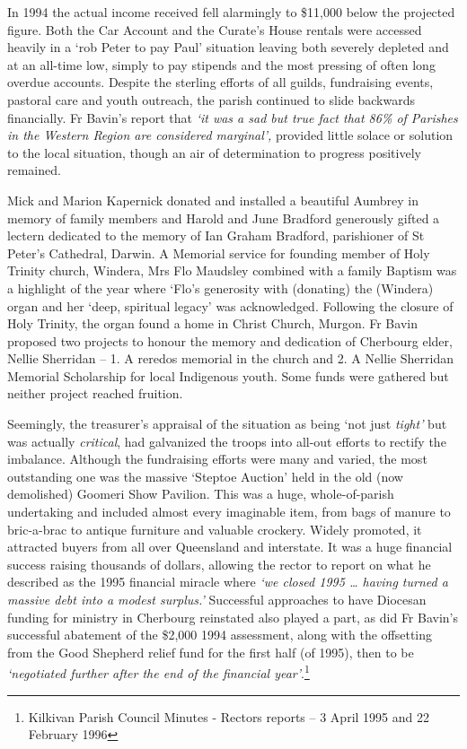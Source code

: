 In 1994 the actual income received fell alarmingly to \$11,000 below the projected figure. Both the Car Account and the Curate's House rentals were accessed heavily in a `rob Peter to pay Paul' situation leaving both severely depleted and at an all-time low, simply to pay stipends and the most pressing of often long overdue accounts. Despite the sterling efforts of all guilds, fundraising events, pastoral care and youth outreach, the parish continued to slide backwards financially. Fr Bavin's report that \emph{`it was a sad but true fact that 86\% of Parishes in the Western Region are considered marginal',} provided little solace or solution to the local situation, though an air of determination to progress positively remained.



Mick and Marion Kapernick donated and installed a beautiful Aumbrey in memory of family members and Harold and June Bradford generously gifted a lectern dedicated to the memory of Ian Graham Bradford, parishioner of St Peter's Cathedral, Darwin. A Memorial service for founding member of Holy Trinity church, Windera, Mrs Flo Maudsley combined with a family Baptism was a highlight of the year where `Flo's generosity with (donating) the (Windera) organ and her `deep, spiritual legacy' was acknowledged. Following the closure of Holy Trinity, the organ found a home in Christ Church, Murgon. Fr Bavin proposed two projects to honour the memory and dedication of Cherbourg elder, Nellie Sherridan -- 1. A reredos memorial in the church and 2. A Nellie Sherridan Memorial Scholarship for local Indigenous youth. Some funds were gathered but neither project reached fruition.



Seemingly, the treasurer's appraisal of the situation as being `not just \emph{tight'} but was actually \emph{critical}, had galvanized the troops into all-out efforts to rectify the imbalance. Although the fundraising efforts were many and varied, the most outstanding one was the massive `Steptoe Auction' held in the old (now demolished) Goomeri Show Pavilion. This was a huge, whole-of-parish undertaking and included almost every imaginable item, from bags of manure to bric-a-brac to antique furniture and valuable crockery. Widely promoted, it attracted buyers from all over Queensland and interstate. It was a huge financial success raising thousands of dollars, allowing the rector to report on what he described as the 1995 financial miracle where \emph{`we closed 1995 \ldots{} having turned a massive debt into a modest surplus.'} Successful approaches to have Diocesan funding for ministry in Cherbourg reinstated also played a part, as did Fr Bavin's successful abatement of the \$2,000 1994 assessment, along with the offsetting from the Good Shepherd relief fund for the first half (of 1995), then to be \emph{`negotiated further after the end of the financial year'}.\footnote{Kilkivan Parish Council Minutes - Rectors reports -- 3 April 1995 and 22 February 1996}








